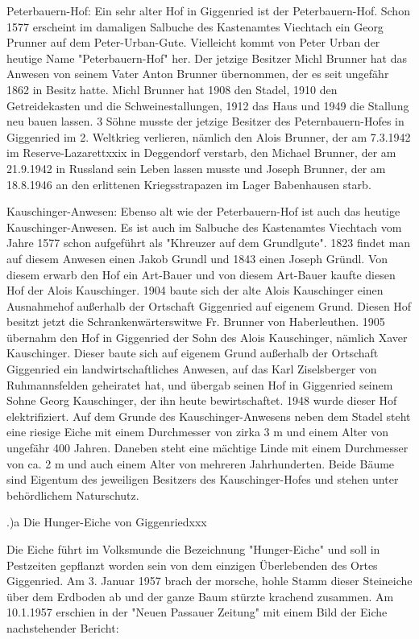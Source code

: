 Peterbauern-Hof: Ein sehr alter Hof in Giggenried ist der Peterbauern-Hof. Schon
1577 erscheint im damaligen Salbuche des Kastenamtes Viechtach ein Georg Prunner
auf dem Peter-Urban-Gute. Vielleicht kommt von Peter Urban der heutige Name
"Peterbauern-Hof" her. Der jetzige Besitzer Michl Brunner hat das Anwesen von
seinem Vater Anton Brunner übernommen, der es seit ungefähr 1862 in Besitz
hatte. Michl Brunner hat 1908 den Stadel, 1910 den Getreidekasten und die
Schweinestallungen, 1912 das Haus und 1949 die Stallung neu bauen lassen. 3
Söhne musste der jetzige Besitzer des Peternbauern-Hofes in Giggenried im 2.
Weltkrieg verlieren, nämlich den Alois Brunner, der am 7.3.1942 im
Reserve-Lazarettxxix in Deggendorf verstarb, den Michael Brunner, der am
21.9.1942 in Russland sein Leben lassen musste und Joseph Brunner, der am
18.8.1946 an den erlittenen Kriegsstrapazen im Lager Babenhausen starb.

Kauschinger-Anwesen: Ebenso alt wie der Peterbauern-Hof ist auch das heutige
Kauschinger-Anwesen. Es ist auch im Salbuche des Kastenamtes Viechtach vom Jahre
1577 schon aufgeführt als "Khreuzer auf dem Grundlgute". 1823 findet man auf
diesem Anwesen einen Jakob Grundl und 1843 einen Joseph Gründl. Von diesem
erwarb den Hof ein Art-Bauer und von diesem Art-Bauer kaufte diesen Hof der
Alois Kauschinger. 1904 baute sich der alte Alois Kauschinger einen Ausnahmehof
außerhalb der Ortschaft Giggenried auf eigenem Grund. Diesen Hof besitzt jetzt
die Schrankenwärterswitwe Fr. Brunner von Haberleuthen. 1905 übernahm den Hof in
Giggenried der Sohn des Alois Kauschinger, nämlich Xaver Kauschinger. Dieser
baute sich auf eigenem Grund außerhalb der Ortschaft Giggenried ein
landwirtschaftliches Anwesen, auf das Karl Ziselsberger von Ruhmannsfelden
geheiratet hat, und übergab seinen Hof in Giggenried seinem Sohne Georg
Kauschinger, der ihn heute bewirtschaftet. 1948 wurde dieser Hof elektrifiziert.
Auf dem Grunde des Kauschinger-Anwesens neben dem Stadel steht eine riesige
Eiche mit einem Durchmesser von zirka 3 m und einem Alter von ungefähr 400
Jahren. Daneben steht eine mächtige Linde mit einem Durchmesser von ca. 2 m und
auch einem Alter von mehreren Jahrhunderten. Beide Bäume sind Eigentum des
jeweiligen Besitzers des Kauschinger-Hofes und stehen unter behördlichem
Naturschutz.

.)a Die Hunger-Eiche von Giggenriedxxx

Die Eiche führt im Volksmunde die Bezeichnung "Hunger-Eiche" und soll in
Pestzeiten gepflanzt worden sein von dem einzigen Überlebenden des Ortes
Giggenried. Am 3. Januar 1957 brach der morsche, hohle Stamm dieser Steineiche
über dem Erdboden ab und der ganze Baum stürzte krachend zusammen. Am 10.1.1957
erschien in der "Neuen Passauer Zeitung" mit einem Bild der Eiche nachstehender
Bericht:

